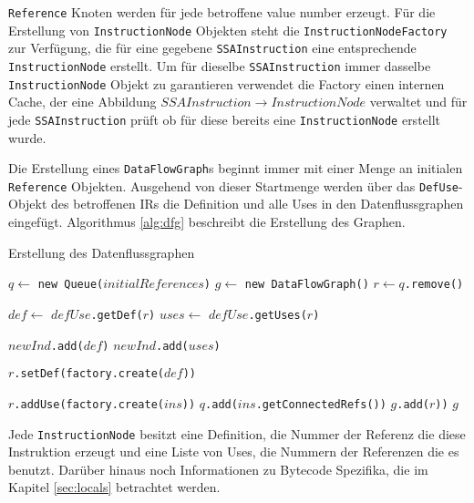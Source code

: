 \texttt{Reference} Knoten werden für jede betroffene value number erzeugt. Für
die Erstellung von \texttt{InstructionNode} Objekten steht die 
\texttt{InstructionNodeFactory} zur Verfügung, die für eine gegebene 
\texttt{SSAInstruction} eine entsprechende \texttt{InstructionNode} erstellt. Um
für dieselbe \texttt{SSAInstruction} immer dasselbe \texttt{InstructionNode} 
Objekt zu garantieren verwendet die Factory einen internen Cache, der eine 
Abbildung $SSAInstruction \rightarrow InstructionNode$ verwaltet und für jede 
\texttt{SSAInstruction} prüft ob für diese bereits eine \texttt{InstructionNode} 
erstellt wurde.

Die Erstellung eines \texttt{DataFlowGraph}s beginnt immer mit einer Menge an 
initialen \texttt{Reference} Objekten. Ausgehend von dieser Startmenge werden über 
das \texttt{DefUse}-Objekt des betroffenen IRs die Definition und alle Uses in den 
Datenflussgraphen eingefügt. Algorithmus \ref{alg:dfg} beschreibt die Erstellung des 
Graphen.

\begin{algorithm}[H]
	\caption{Erstellung des Datenflussgraphen}\label{alg:dfg}
	\begin{algorithmic}[1]
		\STATE $q \gets$ \texttt{new Queue($initialReferences$)}
		\STATE $g \gets$ \texttt{new DataFlowGraph()}
			\STATE $r \gets q$\texttt{.remove()}

				\STATE $def \gets$ \texttt{$defUse$.getDef($r$)}
				\STATE $uses \gets$ \texttt{$defUse$.getUses($r$)}

				\STATE \texttt{$newInd$.add($def$)}
				\STATE \texttt{$newInd$.add($uses$)}

				\STATE \texttt{$r$.setDef(factory.create($def$))}

					\STATE \texttt{$r$.addUse(factory.create($ins$))}
				\ENDFOR
					\STATE \texttt{$q$.add($ins$.getConnectedRefs())}
				\ENDFOR
				\STATE \texttt{$g$.add($r$))}
			\ENDIF
		\ENDWHILE
		\RETURN $g$
	\end{algorithmic}
\end{algorithm}

Jede \texttt{InstructionNode} besitzt eine Definition, die Nummer der Referenz 
die diese Instruktion erzeugt und eine Liste von Uses, die Nummern der Referenzen 
die es benutzt. Darüber hinaus noch Informationen zu Bytecode Spezifika, die 
im Kapitel \ref{sec:locals} betrachtet werden.

